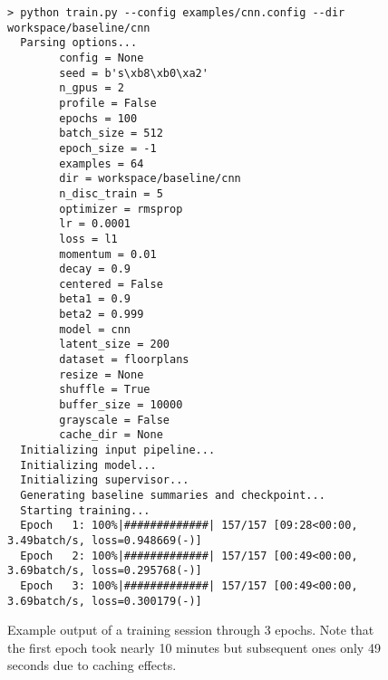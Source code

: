 \documentclass{article}
\begin{document}
\begin{flushleft}
\begin{itemize}
    \begin{figure}
      \begin{verbatim}
> python train.py --config examples/cnn.config --dir workspace/baseline/cnn
  Parsing options...
        config = None
        seed = b's\xb8\xb0\xa2'
        n_gpus = 2
        profile = False
        epochs = 100
        batch_size = 512
        epoch_size = -1
        examples = 64
        dir = workspace/baseline/cnn
        n_disc_train = 5
        optimizer = rmsprop
        lr = 0.0001
        loss = l1
        momentum = 0.01
        decay = 0.9
        centered = False
        beta1 = 0.9
        beta2 = 0.999
        model = cnn
        latent_size = 200
        dataset = floorplans
        resize = None
        shuffle = True
        buffer_size = 10000
        grayscale = False
        cache_dir = None
  Initializing input pipeline...
  Initializing model...
  Initializing supervisor...
  Generating baseline summaries and checkpoint...
  Starting training...
  Epoch   1: 100%|#############| 157/157 [09:28<00:00,  3.49batch/s, loss=0.948669(-)]
  Epoch   2: 100%|#############| 157/157 [00:49<00:00,  3.69batch/s, loss=0.295768(-)]
  Epoch   3: 100%|#############| 157/157 [00:49<00:00,  3.69batch/s, loss=0.300179(-)]
      \end{verbatim}
      \caption{Example output of a training session through 3 epochs. Note that the first epoch took nearly 10 minutes but subsequent ones only 49 seconds due to caching effects.} 
    \end{figure}

    
    

  \end{itemize}
  



\end{flushleft}
\end{document}
